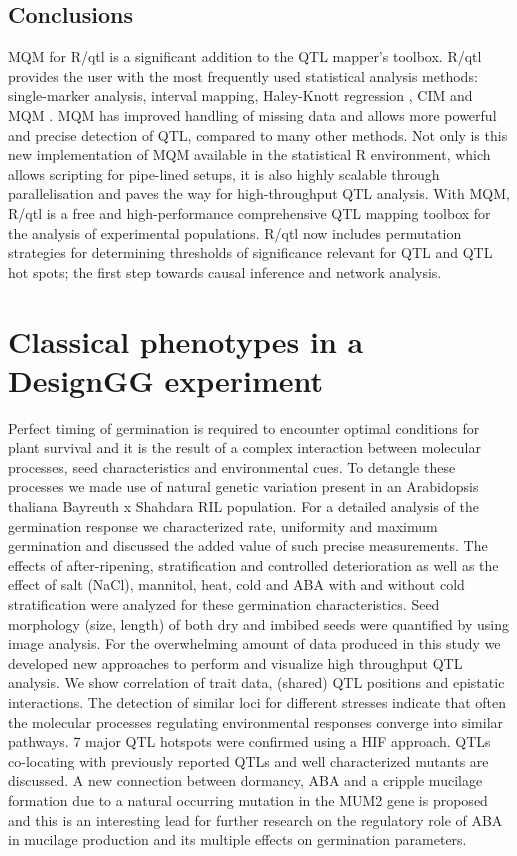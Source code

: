 \documentclass[8pt, twoside, a5paper]{report}
\begin{document}
\subsection{Conclusions}
MQM for R/qtl is a significant addition to the QTL mapper's toolbox. R/qtl provides the user with the most frequently 
used statistical analysis methods: single-marker analysis, interval mapping, Haley-Knott regression \cite{Haley:1992}, 
CIM \cite{Zeng:1994} and MQM \cite{Jansen:1994a}.  MQM has improved handling of missing data and allows more powerful 
and precise detection of QTL, compared to many other methods. Not only is this new implementation of MQM available in the
statistical R environment, which allows scripting for pipe-lined setups, it is also highly scalable through 
parallelisation and paves the way for high-throughput QTL analysis. With MQM, R/qtl is a free and high-performance 
comprehensive QTL mapping toolbox for the analysis of experimental populations. R/qtl now includes permutation strategies 
for determining thresholds of significance relevant for QTL and QTL hot spots; the first step towards causal inference and
network analysis.

\section{Classical phenotypes in a DesignGG experiment}
Perfect timing of germination is required to encounter optimal conditions for plant survival and it is the result of a complex 
interaction between molecular processes, seed characteristics and environmental cues. To detangle these processes we made use 
of natural genetic variation present in an Arabidopsis thaliana Bayreuth x Shahdara RIL population. For a detailed analysis of 
the germination response we characterized rate, uniformity and maximum germination and discussed the added value of such precise
measurements. The effects of after-ripening, stratification and controlled deterioration as well as the effect of salt (NaCl), 
mannitol, heat, cold and ABA with and without cold stratification were analyzed for these germination characteristics. Seed 
morphology (size, length) of both dry and imbibed seeds were quantified by using image analysis. For the overwhelming amount 
of data produced in this study we developed new approaches to perform and visualize high throughput QTL analysis. We show 
correlation of trait data, (shared) QTL positions and epistatic interactions. The detection of similar loci for different 
stresses indicate that often the molecular processes regulating environmental responses converge into similar pathways. 7 major 
QTL hotspots were confirmed using a HIF approach. QTLs co-locating with previously reported QTLs and well characterized mutants 
are discussed. A new connection between dormancy, ABA and a cripple mucilage formation due to a natural occurring mutation in the
MUM2 gene is proposed and this is an interesting lead for further research on the regulatory role of ABA in mucilage production 
and its multiple effects on germination parameters.
\end{document}
